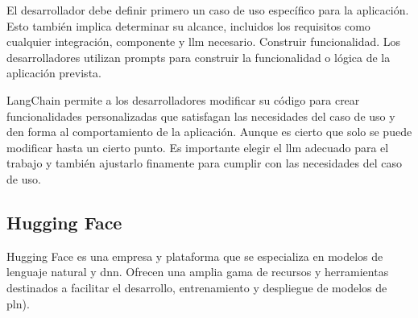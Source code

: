 El desarrollador debe definir primero un caso de uso específico para la aplicación. Esto también implica determinar su alcance, incluidos los requisitos como cualquier integración, componente y \acrshort{llm} necesario.
Construir funcionalidad. Los desarrolladores utilizan prompts para construir la funcionalidad o lógica de la aplicación prevista.

LangChain permite a los desarrolladores modificar su código para crear funcionalidades personalizadas que satisfagan las necesidades del caso de uso y den forma al comportamiento de la aplicación. Aunque es cierto que solo se puede modificar hasta un cierto punto. Es importante elegir el \acrshort{llm} adecuado para el trabajo y también ajustarlo finamente para cumplir con las necesidades del caso de uso.

\subsection{Hugging Face}

Hugging Face es una empresa y plataforma que se especializa en modelos de lenguaje natural y \acrlong{dnn}. Ofrecen una amplia gama de recursos y herramientas destinados a facilitar el desarrollo, entrenamiento y despliegue de modelos de \acrfull{pln}).

